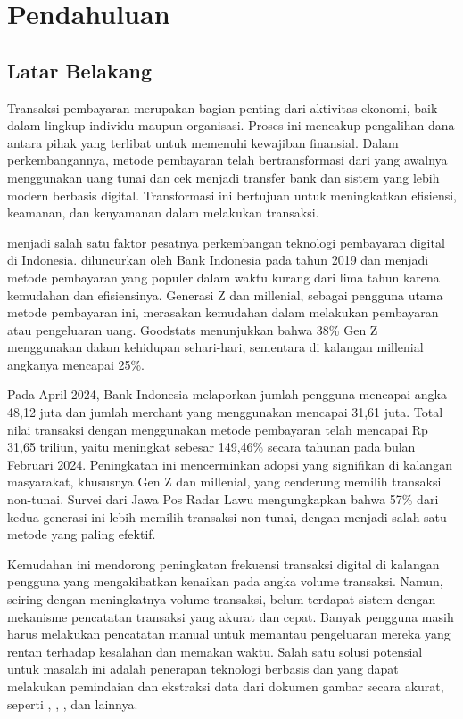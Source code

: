 \chapter{Pendahuluan}

\section{Latar Belakang}
\label{sec:latarbelakang}

Transaksi pembayaran merupakan bagian penting dari aktivitas ekonomi, baik dalam lingkup individu maupun organisasi. Proses ini mencakup pengalihan dana antara pihak yang terlibat untuk memenuhi kewajiban finansial. Dalam perkembangannya, metode pembayaran telah bertransformasi dari yang awalnya menggunakan uang tunai dan cek menjadi transfer bank dan sistem yang lebih modern berbasis digital. Transformasi ini bertujuan untuk meningkatkan efisiensi, keamanan, dan kenyamanan dalam melakukan transaksi.

\qrisfull{} menjadi salah satu faktor pesatnya perkembangan teknologi pembayaran digital di Indonesia. \qris{} diluncurkan oleh Bank Indonesia pada tahun 2019 dan menjadi metode pembayaran yang populer dalam waktu kurang dari lima tahun karena kemudahan dan efisiensinya. Generasi Z dan millenial, sebagai pengguna utama metode pembayaran ini, merasakan kemudahan dalam melakukan pembayaran atau pengeluaran uang. Goodstats menunjukkan bahwa 38\% Gen Z menggunakan \qris{} dalam kehidupan sehari-hari, sementara di kalangan millenial angkanya mencapai 
25\%. 

Pada April 2024, Bank Indonesia melaporkan jumlah pengguna \qris{} mencapai angka 48,12 juta dan jumlah merchant yang menggunakan mencapai 31,61 juta. Total nilai transaksi dengan menggunakan metode pembayaran \qris{} telah mencapai Rp 31,65 triliun, yaitu meningkat sebesar 149,46\% secara tahunan 
pada bulan Februari 2024. Peningkatan ini mencerminkan adopsi yang signifikan di kalangan masyarakat, khususnya Gen Z dan millenial, yang cenderung memilih 
transaksi non-tunai. Survei dari Jawa Pos Radar Lawu mengungkapkan bahwa 57\% dari kedua generasi ini lebih memilih transaksi non-tunai, dengan \qris{} menjadi salah satu metode yang paling efektif. 

\newpage

Kemudahan ini mendorong peningkatan frekuensi transaksi digital di kalangan pengguna yang mengakibatkan kenaikan pada angka volume transaksi. Namun, seiring dengan meningkatnya volume transaksi, belum terdapat sistem dengan mekanisme pencatatan transaksi yang akurat dan cepat. Banyak pengguna masih harus melakukan pencatatan manual untuk memantau pengeluaran mereka yang rentan terhadap kesalahan dan memakan waktu. Salah satu solusi potensial untuk masalah ini adalah penerapan teknologi berbasis \cvfull{} dan \dl{} yang dapat melakukan pemindaian dan ekstraksi data dari dokumen gambar secara akurat, seperti \ocrfull, \cnnfull, \transformer, dan lainnya.

